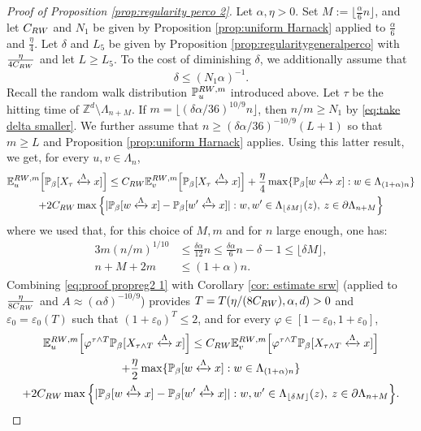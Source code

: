 \documentclass[10pt,a4paper]{amsart}
\newcommand{\connect}{\xleftrightarrow}
\begin{document}
\begin{proof}[Proof of Proposition \textup{\ref{prop:regularity perco 2}}] Let $\alpha,\eta>0$. Set $M:=\lfloor \tfrac{\alpha}{6} n\rfloor$, and let $C_{\rm RW}$ and $N_1$ be given by Proposition \ref{prop:uniform Harnack} applied to $\tfrac{\alpha}{6}$ and $\tfrac{\eta}{4}$.
Let $\delta$ and $L_5$ be given by Proposition \ref{prop:regularitygeneralperco} with $\frac{\eta}{4C_{\rm RW}}$ and let $L\geq L_5$. To the cost of diminishing $\delta$, we additionally assume that
\begin{equation}\label{eq:take delta smaller}
	\delta\leq (N_1\alpha)^{-1}.
\end{equation}
Recall the random walk distribution $\mathbb P^{{\rm RW},m}_u$ introduced above. Let $\tau$ be the hitting time of $\mathbb Z^d\setminus\Lambda_{n+M}$. If $m=\lfloor (\delta\alpha/36)^{10/9}n\rfloor$, then $n/m\geq N_1$ by \eqref{eq:take delta smaller}. We further assume that $n\geq (\delta\alpha/36)^{-10/9}(L+1)$ so that $m\geq L$ and Proposition \ref{prop:uniform Harnack} applies. Using this latter result, we get, for every $u,v\in \Lambda_n$,
\begin{multline}\label{eq:proof propreg2 1}
	\mathbb E^{{\rm RW},m}_u\Big[\mathbb P_\beta[X_\tau \connect{\Lambda\:}x]\Big]\leq C_{\rm RW}\mathbb E^{{\rm RW},m}_v\Big[\mathbb P_\beta[X_\tau \connect{\Lambda\:}x]\Big]+\frac{\eta}{4}\max\{\mathbb P_\beta[w \connect{\Lambda\:}x]:w\in \Lambda_{(1+\alpha)n}\}\\+2C_{\rm RW}\max \Big\{|\mathbb P_\beta[w \connect{\Lambda\:}x]-\mathbb P_\beta[w'\connect{\Lambda\:}x]|: w,w'\in \Lambda_{\lfloor \delta M\rfloor}(z), \: z\in \partial \Lambda_{n+M}\Big\} 
\end{multline}
where we used that, for this choice of $M,m$ and for $n$ large enough, one has: 
\begin{align}
3m(n/m)^{1/10}&\leq \frac{\delta \alpha}{12}n\leq \frac{\delta\alpha}{6}n-\delta-1\leq \lfloor\delta M\rfloor,\\
n+M+2m&\leq (1+\alpha)n.\end{align} 
Combining \eqref{eq:proof propreg2 1} with Corollary \ref{cor: estimate srw} (applied to $\frac{\eta}{8C_{\rm RW}}$ and $A\approx (\alpha\delta)^{-10/9}$) provides $T=T(\eta/(8C_{\rm RW}),\alpha,d)>0$ and $\varepsilon_0=\varepsilon_0(T)$ such that $(1+\varepsilon_0)^T\leq 2$, and for every $\varphi\in [1-\varepsilon_0,1+\varepsilon_0]$,
\begin{multline}\label{eq:proof propreg2 1.5}
	\mathbb E_u^{{\rm RW},m}\Big[\varphi^{\tau\wedge T}\mathbb P_\beta[X_{\tau\wedge T}\connect{\Lambda\:}x]\Big]\leq C_{\rm RW}\mathbb E_v^{{\rm RW},m}\Big[\varphi^{\tau\wedge T}\mathbb P_\beta[X_{\tau\wedge T}\connect{\Lambda\:}x]\Big]\\+\frac{\eta}{2}\max\{\mathbb P_\beta[w\connect{\Lambda\:}x]:w\in \Lambda_{(1+\alpha)n}\}\\+2C_{\rm RW}\max \Big\{|\mathbb P_\beta[w\connect{\Lambda\:}x]-\mathbb P_\beta[w'\connect{\Lambda\:}x]|: w,w'\in \Lambda_{\lfloor \delta M\rfloor}(z), \: z\in \partial \Lambda_{n+M}\Big\}.

\end{multline}
\end{proof}
\end{document}
